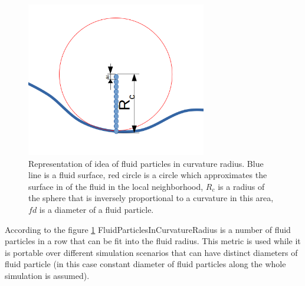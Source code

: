 \begin{figure}[H]
	\begin{center}
		\includegraphics[width=0.7\textwidth]{figures/ParticlesInCurvatureRatius.png}
	\end{center}
	\caption{Representation of idea of fluid particles in curvature radius. Blue line is a fluid surface, red circle is a circle which approximates the surface in of the fluid in the local neighborhood, $R_c$ is a radius of the sphere that is inversely proportional to a curvature in this area, $fd$ is a diameter of a fluid particle.} \label{fig:FluidParticlesInCurvatureRadius}
	\label{fig:FluidParticlesInCurvatureRadius}
\end{figure}
According to the figure \ref{fig:FluidParticlesInCurvatureRadius} FluidParticlesInCurvatureRadius is a number of fluid particles in a row that can be fit into the fluid radius. This metric is used while it is portable over different simulation scenarios that can have distinct diameters of fluid particle (in this case constant diameter of fluid particles along the whole simulation is assumed).

